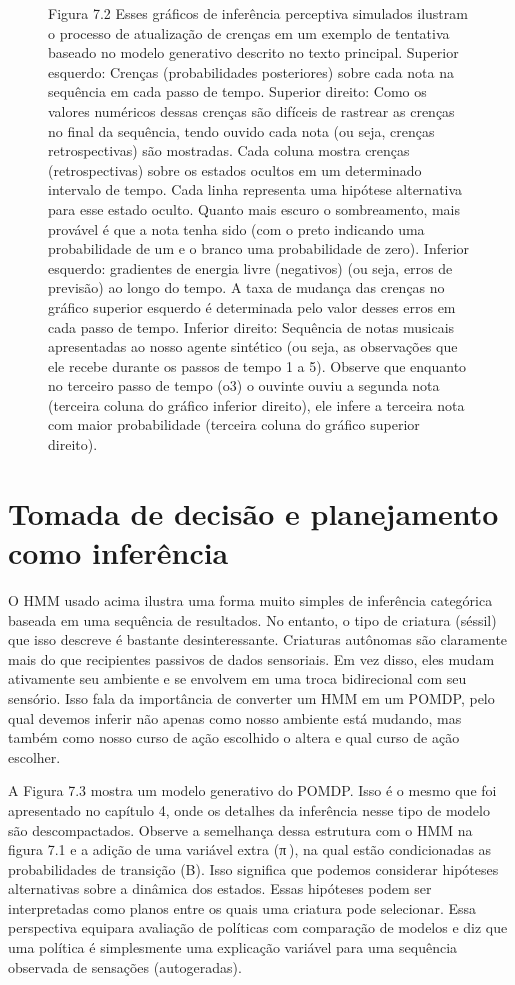 \documentclass[
  12pt,
]{book}
\begin{document}
\begin{figure}
\caption{Figura 7.2 Esses gráficos de inferência perceptiva simulados ilustram o processo de atualização de crenças em um exemplo de tentativa baseado no modelo generativo descrito no texto principal. Superior esquerdo: Crenças (probabilidades posteriores) sobre cada nota na sequência em cada passo de tempo. Superior direito: Como os valores numéricos dessas crenças são difíceis de rastrear as crenças no final da sequência, tendo ouvido cada nota (ou seja, crenças retrospectivas) são mostradas. Cada coluna mostra crenças (retrospectivas) sobre os estados ocultos em um determinado intervalo de tempo. Cada linha representa uma hipótese alternativa para esse estado oculto. Quanto mais escuro o sombreamento, mais provável é que a nota tenha sido (com o preto indicando uma probabilidade de um e o branco uma probabilidade de zero). Inferior esquerdo: gradientes de energia livre (negativos) (ou seja, erros de previsão) ao longo do tempo. A taxa de mudança das crenças no gráfico superior esquerdo é determinada pelo valor desses erros em cada passo de tempo. Inferior direito: Sequência de notas musicais apresentadas ao nosso agente sintético (ou seja, as observações que ele recebe durante os passos de tempo 1 a 5). Observe que enquanto no terceiro passo de tempo (o3) o ouvinte ouviu a segunda nota (terceira coluna do gráfico inferior direito), ele infere a terceira nota com maior probabilidade (terceira coluna do gráfico superior direito).}
\end{figure}

\hypertarget{tomada-de-decisuxe3o-e-planejamento-como-inferuxeancia}{%
\section{Tomada de decisão e planejamento como inferência}\label{tomada-de-decisuxe3o-e-planejamento-como-inferuxeancia}}

O HMM usado acima ilustra uma forma muito simples de inferência categórica baseada em uma sequência de resultados. No entanto, o tipo de criatura (séssil) que isso descreve é bastante desinteressante. Criaturas autônomas são claramente mais do que recipientes passivos de dados sensoriais. Em vez disso, eles mudam ativamente seu ambiente e se envolvem em uma troca bidirecional com seu sensório. Isso fala da importância de converter um HMM em um POMDP, pelo qual devemos inferir não apenas como nosso ambiente está mudando, mas também como nosso curso de ação escolhido o altera e qual curso de ação escolher.

A Figura 7.3 mostra um modelo generativo do POMDP. Isso é o mesmo que foi apresentado no capítulo 4, onde os detalhes da inferência nesse tipo de modelo são descompactados. Observe a semelhança dessa estrutura com o HMM na figura 7.1 e a adição de uma variável extra (π ), na qual estão condicionadas as probabilidades de transição (B). Isso significa que podemos considerar hipóteses alternativas sobre a dinâmica dos estados. Essas hipóteses podem ser interpretadas como planos entre os quais uma criatura pode selecionar. Essa perspectiva equipara avaliação de políticas com comparação de modelos e diz que uma política é simplesmente uma explicação
variável para uma sequência observada de sensações (autogeradas).
\end{document}
